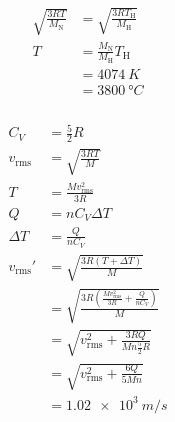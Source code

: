 \documentclass{article}
\begin{document}
\begin{align*}
  \sqrt{\frac{3 R T}{M_\text{N}}} & = \sqrt{\frac{3 R T_\text{H}}{M_\text{H}}} \\
  T                               & = \frac{M_\text{N}}{M_\text{H}} T_\text{H} \\
                                  & = \qty{4074}{K}                            \\
                                  & = \qty{3800}{\degree C}
\end{align*}

\setcounter{subsubsection}{34}
\subsubsection{}

\begin{align*}
  C_V           & = \frac{5}{2} R                                                                      \\
  v_\text{rms}  & = \sqrt{\frac{3 R T}{M}}                                                             \\
  T             & = \frac{M v_\text{rms}^2}{3 R}                                                       \\
  Q             & = n C_V \Delta T                                                                     \\
  \Delta T      & = \frac{Q}{n C_V}                                                                    \\
  v_\text{rms}' & = \sqrt{\frac{3 R (T + \Delta T)}{M}}                                                \\
                & = \sqrt{\frac{3 R \left( \frac{M v_\text{rms}^2}{3 R} + \frac{Q}{n C_V} \right)}{M}} \\
                & = \sqrt{v_\text{rms}^2 + \frac{3 R Q}{M n \frac{5}{2} R}}                            \\
                & = \sqrt{v_\text{rms}^2 + \frac{6 Q}{5 M n}}                                          \\
                & = \qty{1.02e3}{m/s}
\end{align*}

\setcounter{subsubsection}{38}
\subsubsection{}
\end{document}
